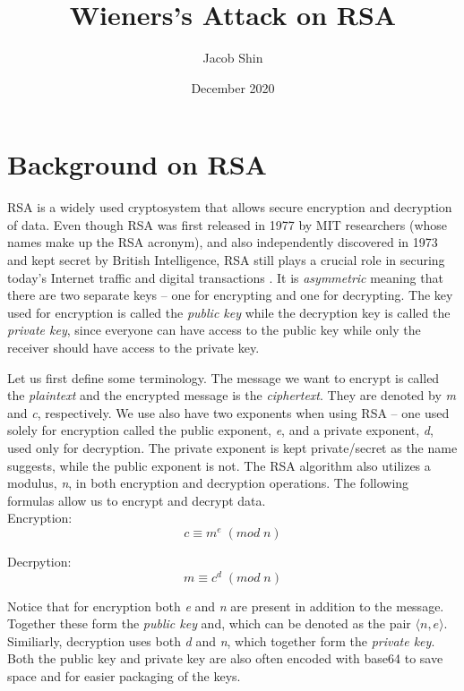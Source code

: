 \documentclass[11pt]{article}
\title{Wieners's Attack on RSA}
\author{Jacob Shin}
\date{December 2020}
\begin{document}
\maketitle


\section{Background on RSA}
RSA is a widely used cryptosystem that allows secure encryption and decryption of data. Even though RSA was first released in 1977 by MIT researchers (whose names make up the RSA acronym), and also independently discovered in 1973 and kept secret by British Intelligence, RSA still plays a crucial role in securing today's Internet traffic and digital transactions \cite{boneh, rosen}. It is \emph{asymmetric} meaning that there are two separate keys -- one for encrypting and one for decrypting. The key used for encryption is called the \emph{public key} while the decryption key is called the \emph{private key}, since everyone can have access to the public key while only the receiver should have access to the private key.

Let us first define some terminology. The message we want to encrypt is called the \emph{plaintext} and the encrypted message is the \emph{ciphertext}. They are denoted by \emph{m} and \emph{c}, respectively. We use also have two exponents when using RSA -- one used solely for encryption called the public exponent, \emph{e}, and a private exponent, \emph{d}, used only for decryption. The private exponent is kept private/secret as the name suggests, while the public exponent is not. The RSA algorithm also utilizes a modulus, \emph{n}, in both encryption and decryption operations. The following formulas allow us to encrypt and decrypt data.\\

Encryption:
\begin{equation} c \equiv m^e \; (mod \; n)\end{equation}

Decrpytion:
\begin{equation} m \equiv c^d \; (mod \; n)\end{equation}

Notice that for encryption both \emph{e} and \emph{n} are present in addition to the message. Together these form the \emph{public key} and, which can be denoted as the pair $\langle n, e \rangle$. Similiarly, decryption uses both \emph{d} and \emph{n}, which together form the \emph{private key}. Both the public key and private key are also often encoded with base64 to save space and for easier packaging of the keys.\\
\end{document}
